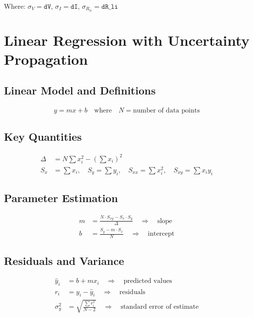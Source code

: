 \documentclass{article} %
\begin{document}
Where: $\sigma_V = \texttt{dV}$, $\sigma_I = \texttt{dI}$, $\sigma_{R_{li}} = \texttt{dR\_li}$

\newpage

\section{Linear Regression with Uncertainty Propagation}
\label{app:c_linear_uncertainties}

\subsection*{Linear Model and Definitions}
\begin{align*}
y = mx + b \quad \text{where} \quad N = \text{number of data points}
\end{align*}

\subsection*{Key Quantities}
\begin{align*}
\Delta &= N \sum x_i^2 - \left(\sum x_i\right)^2 \\
S_x &= \sum x_i, \quad S_y = \sum y_i, \quad S_{xx} = \sum x_i^2, \quad S_{xy} = \sum x_i y_i
\end{align*}

\subsection*{Parameter Estimation}
\begin{align*}
m &= \frac{N \cdot S_{xy} - S_x \cdot S_y}{\Delta} \quad \Rightarrow \quad \text{slope} \\
b &= \frac{S_y - m \cdot S_x}{N} \quad \Rightarrow \quad \text{intercept}
\end{align*}

\subsection*{Residuals and Variance}
\begin{align*}
\hat{y}_i &= b + m x_i \quad \Rightarrow \quad \text{predicted values} \\
r_i &= y_i - \hat{y}_i \quad \Rightarrow \quad \text{residuals} \\
\sigma_y^2 &= \sqrt{\frac{\sum r_i^2}{N-2}} \quad \Rightarrow \quad \text{standard error of estimate}
\end{align*}
\end{document}
